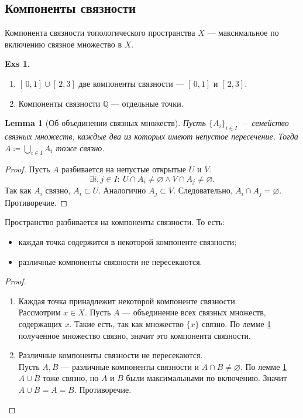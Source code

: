 \documentclass[11pt]{book}
\newcommand{\Q}{\mathbb{Q}}
\theoremstyle{definition}
\theoremstyle{plain}
\theoremstyle{plain}
\newtheorem*{lm}{Lemma}
\theoremstyle{definition}
\newtheorem*{exs}{Exs}
\theoremstyle{remark}
\begin{document}
\subsection{Компоненты связности}
\begin{defn}
    Компонента связности топологического пространства $ X$ ---  максимальное по включению связное множество в $ X$.
\end{defn}
\begin{exs}
    $ $
    \begin{enumerate}
	\item $ [\,0,1]\cup [\,2, 3]$ две компоненты связности --- $ [\,0,1]$ и  $ [\,2, 3]$.
	\item Компоненты связности  $ \Q$ --- отдельные точки.
    \end{enumerate}
\end{exs}
\begin{lm}[Об объединении связных множеств]\label{lm_subset}
    Пусть $ \{A_i\}_{i \in  I}$ --- семейство связных множеств, каждые два из которых имеют непустое пересечение. Тогда $
    A \coloneqq \bigcup_{i \in  I} A_i
    $ тоже связно.
\end{lm}
\begin{proof}
    Пусть $ A$ разбивается на непустые открытые $ U$   и $ V$.
    \[
	\exists i, j \in  I: ~ U \cap A_i \ne \varnothing \wedge V \cap A_j \ne  \varnothing
    .\]
    Так как $ A_i$ связно, $ A_i \subset U$. Аналогично $ A_j \subset V$. Следовательно, $ A_i \cap A_j = \varnothing$. Противоречие.
\end{proof}
\begin{thm}
    Пространство разбивается на компоненты связности. То есть:
    \begin{itemize}
	\item  каждая точка содержится в некоторой компоненте связности;
	\item различные компоненты связности не пересекаются.
    \end{itemize}
\end{thm}
\begin{proof}
    $ $
    \begin{enumerate}
	\item Каждая точка принадлежит некоторой компоненте связности. \\
	    Рассмотрим $ x \in X$. Пусть $ A$ --- объединение всех связных множеств, содержащих  $ x$. Такие есть, так как множество  $ \{x\}$ связно. По лемме \ref{lm_subset} полученное множество связно, значит это компонента связности.
	\item Различные компоненты связности не пересекаются.\\
	    Пусть $ A, B$ --- различные компоненты связности и  $ A \cap B \ne \varnothing$. По лемме \ref{lm_subset} $ A \cup B$ тоже связно, но $ A$ и  $ B$ были максимальными по включению. Значит  $ A \cup B = A = B$. Противоречие.
    \end{enumerate}
\end{proof}
\end{document}
